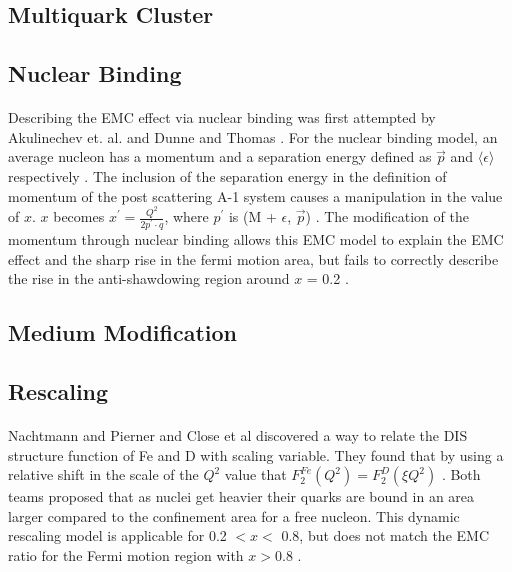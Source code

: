 \subsection{Multiquark Cluster}
\paragraph{}
\cite{Geesaman}
\cite{EMC_model_1}
\cite{EMC_multiQ}
\subsection{Nuclear Binding}
\paragraph{} Describing the EMC effect via nuclear binding was first attempted by Akulinechev et. al. \cite{EMC_binding_3} and Dunne and Thomas \cite{EMC_binding_2}. For the nuclear binding model, an average nucleon has a momentum and a separation energy defined as $\vec{p}$ and $\langle \epsilon \rangle$ respectively \cite{Norton}. The inclusion of the separation energy in the definition of momentum of the post scattering A-1 system causes a manipulation in the value of $x$. $x$ becomes $x^{\prime} = \frac{Q^2}{2p^{\prime}\cdot q}$, where $p^{\prime}$ is (M + $\epsilon$, $\vec{p}$) \cite{Norton}. The modification of the momentum through nuclear binding allows this EMC model to explain the EMC effect and the sharp rise in the fermi motion area, but fails to correctly describe the rise in the anti-shawdowing region around $x$ = 0.2 \cite{EMC_binding, EMC_model_1, Ajth}.

\subsection{Medium Modification}
\paragraph{}
\cite{EMC_medium_1}
\cite{EMC_medium_2}
\subsection{Rescaling}
\paragraph{} Nachtmann and Pierner \cite{EMC_rescaling_2} and Close et al \cite{EMC_rescaling_1} discovered a way to relate the DIS structure function of Fe and D with scaling variable. They found that by using a relative shift in the scale of the $Q^2$ value that $F_2^{Fe}(Q^2) =F_2^{D}(\xi Q^2)$ \cite{Geesaman}. Both teams proposed that as nuclei get heavier their quarks are bound in an area larger compared to the confinement area for a free nucleon. This dynamic rescaling model is applicable for 0.2 $ < x <$ 0.8, but does not match the EMC ratio for the Fermi motion region with $x > 0.8$ \cite{EMC_model_1, EMC_rescaling_1, Geesaman, EMC_rescaling_2}.



